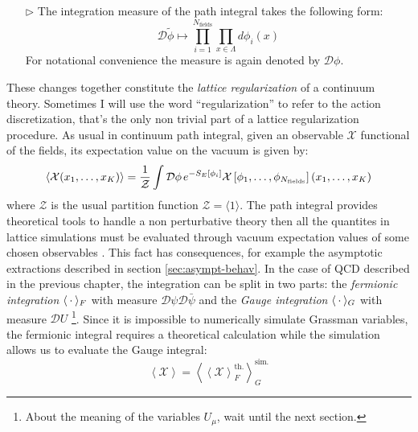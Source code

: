 \documentclass[english, LaM, oneside, noexaminfo]{sapthesis}
\newcommand{\la}{\langle}
\newcommand{\ra}{\rangle}
\begin{document}
\begin{itemize}
    \item [$\triangleright$] The integration measure of the path integral takes the following form:
        \begin{equation*}
            \mathcal{D}\tilde{\phi} \longmapsto \prod_{i=1}^{N_\text{fields}} \prod_{x\in \Lambda} d\phi_i (x)
        \end{equation*}
        For notational convenience the measure is again denoted by $\mathcal{D}\phi$.
\end{itemize}
These changes together constitute the \textit{lattice regularization} of a continuum theory. 
Sometimes I will use the word ``regularization'' to refer to the action discretization, that's the only non trivial part of a lattice regularization procedure. 
\newline
As usual in continuum path integral, given an observable $\mathcal{X}$ functional of the fields, its expectation value on the vacuum is given by:
\begin{equation*}
    \la \mathcal{X} (x_1,\dots,x_K) \ra = \frac{1}{\mathcal Z} \int \mathcal{D} \phi \hspace*{0.5mm} e^{-S_E[\phi_i]} \mathcal{X}\left[\phi_1,\dots,\phi_{N_\text{fields}}\right] (x_1,\dots,x_K)
\end{equation*}
where $\mathcal Z$ is the usual partition function $\mathcal Z = \la 1 \ra$.
The path integral provides theoretical tools to handle a non perturbative theory then all the quantites in lattice simulations must be evaluated through vacuum expectation values of some chosen observables \cite{Itzykson-Zuber}.
This fact has consequences, for example the asymptotic extractions described in section \ref{sec:asympt-behav}.
\newline
In the case of QCD described in the previous chapter, the integration can be split in two parts: the {\it fermionic integration} $\la \hspace*{0.7mm} \cdot \hspace*{0.7mm} \ra_F$ with measure $\mathcal{D}\psi\mathcal{D}\bar\psi$ and the {\it Gauge integration} $\la \hspace*{0.7mm} \cdot \hspace*{0.7mm} \ra_G$ with measure $\mathcal{D}U$ \footnote{About the meaning of the variables $U_\mu$, wait until the next section.}.
Since it is impossible to numerically simulate Grassman variables, the fermionic integral requires a theoretical calculation while the simulation allows us to evaluate the Gauge integral:
\begin{equation*}
    \left\la \mathcal{X} \right\ra = \left\la \left\la \mathcal{X} \right\ra_F^\text{th.} \right\ra_G^\text{sim.}
\end{equation*}
\end{document}
